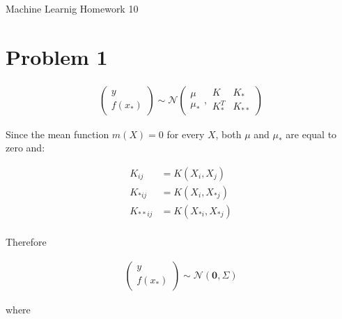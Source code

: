 \documentclass[12pt]{article}
\begin{document}
\begin{center}
{\Large Machine Learnig Homework 10} \\[.3in]
\end{center}
\vspace*{.5in}


\section*{Problem 1}

\begin{equation}
\begin{align}
  \begin{pmatrix} y \\ f(x_*) \end{pmatrix} \sim \mathcal{N} \left( \begin{matrix} \mu \\ \mu_* \end{matrix}, \begin{matrix} K & K_* \\ K_*^T & K_{**} \end{matrix} \right)
\end{align}
\end{equation}

Since the mean function $m(X) = 0$ for every $X$, both $\mu$ and $\mu_*$ are equal to zero and:

\begin{equation}
\begin{align}
 K_{ij} &= K(X_i, X_j) \\
 K_{* ij} &= K(X_i, X_{* j}) \\
 K_{** ij} &= K(X_{* i}, X_{*j}) \\
\end{align}
\end{equation}

Therefore 

\begin{equation}
\begin{align}
  \begin{pmatrix} y \\ f(x_*) \end{pmatrix} \sim \mathcal{N} \left( \mathbf{0}, \Sigma \right)
\end{align}
\end{equation}

where
\end{document}
